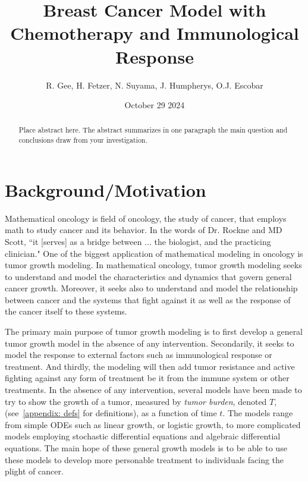 \documentclass[11pt]{amsart}
\title{Breast Cancer Model with Chemotherapy and Immunological Response}
\author{R. Gee, H. Fetzer, N. Suyama, J. Humpherys, O.J. Escobar}
\date{October 29 2024} %
\begin{document}
\maketitle %

\begin{abstract}
Place abstract here. The abstract summarizes in one paragraph the main question and conclusions draw from your investigation.
\end{abstract}

\section{Background/Motivation}

Mathematical oncology is field of oncology, the study of cancer, that employs math to study cancer and its behavior.
In the words of Dr. Rockne and MD Scott, ``it [serves] as a bridge between $\ldots$ the biologist, and the practicing clinician." \cite{IntroMathOnc}
One of the biggest application of mathematical modeling in oncology is tumor growth modeling.
In mathematical oncology, tumor growth modeling seeks to understand and model the characteristics and dynamics that govern general cancer growth.
Moreover, it seeks also to understand and model the relationship between cancer and the systems that fight against it as well as the response of the cancer itself to these systems.

The primary main purpose of tumor growth modeling is to first develop a general tumor growth model in the absence of any intervention.
Secondarily, it seeks to model the response to external factors such as immunological response or treatment. 
And thirdly, the modeling will then add tumor resistance and active fighting against any form of treatment be it from the immune system or other treatments.
In the absence of any intervention, several models have been made to try to show the growth of a tumor, measured by \textit{tumor burden}, denoted $T$, (see\ \ref{appendix: defs} for definitions), as a function of time $t$.
The models range from simple ODEs such as linear growth, or logistic growth, to more complicated models employing stochastic differential equations and algebraic differential equations. 
The main hope of these general growth models is to be able to use these models to develop more personable treatment to individuals facing the plight of cancer.\ \cite{YinMoes}
\end{document}
